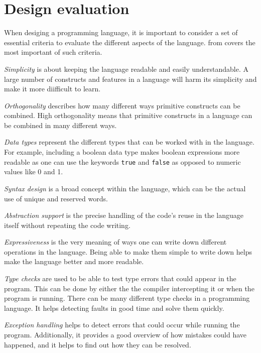 \section{Design evaluation} \label{chap:design evaluation}
When desiging a programming language, it is important to consider a set of essential criteria to evaluate the different aspects of the language.
 from \cite{sebesta_concepts_2016} covers the most important of such criteria.


\textit{Simplicity} is about keeping the language readable and easily understandable. A large number of constructs and features in a language will harm its simplicity and make it more diifficult to learn.

\textit{Orthogonality} describes how many different ways primitive constructs can be combined. High orthogonality means that primitive constructs in a language can be combined in many different ways. 

\textit{Data types} represent the different types that can be worked with in the language. For example, including a boolean data type makes boolean expressions more readable as one can use the keywords \texttt{true} and \texttt{false} as opposed to numeric values like 0 and 1.

\textit{Syntax design} is a broad concept within the language, which can be the actual use of unique and reserved words.

\textit{Abstraction support} is the precise handling of the code's reuse in the language itself without repeating the code writing.

\textit{Expressiveness} is the very meaning of ways one can write down different operations in the language. Being able to make them simple to write down helps make the language better and more readable.

\textit{Type checks} are used to be able to test type errors that could appear in the program. This can be done by either the the compiler intercepting it or when the program is running. There can be many different type checks in a programming language. It helps detecting faults in good time and solve them quickly.

\textit{Exception handling} helps to detect errors that could occur while running the program. Additionally, it provides a good overview of how mistakes could have happened, and it helps to find out how they can be resolved.

